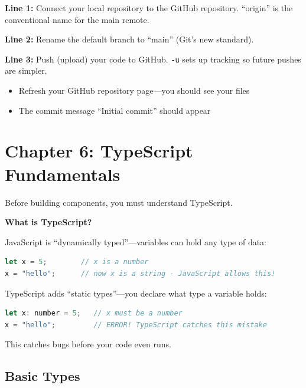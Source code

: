 \documentclass[12pt,a4paper]{article}
\begin{document}
\begin{explanation}
\textbf{Line 1:} Connect your local repository to the GitHub repository. ``origin'' is the conventional name for the main remote.

\textbf{Line 2:} Rename the default branch to ``main'' (Git's new standard).

\textbf{Line 3:} Push (upload) your code to GitHub. \texttt{-u} sets up tracking so future pushes are simpler.
\end{explanation}

\begin{checkpoint}
\begin{itemize}
    \item[$\square$] Refresh your GitHub repository page---you should see your files
    \item[$\square$] The commit message ``Initial commit'' should appear
\end{itemize}
\end{checkpoint}

\section{Chapter 6: TypeScript Fundamentals}

Before building components, you must understand TypeScript.

\begin{concept}
\textbf{What is TypeScript?}

JavaScript is ``dynamically typed''---variables can hold any type of data:
\begin{lstlisting}[language=JavaScript]
let x = 5;        // x is a number
x = "hello";      // now x is a string - JavaScript allows this!
\end{lstlisting}

TypeScript adds ``static types''---you declare what type a variable holds:
\begin{lstlisting}[language=JavaScript]
let x: number = 5;   // x must be a number
x = "hello";         // ERROR! TypeScript catches this mistake
\end{lstlisting}

This catches bugs before your code even runs.
\end{concept}

\subsection{Basic Types}
\end{document}
